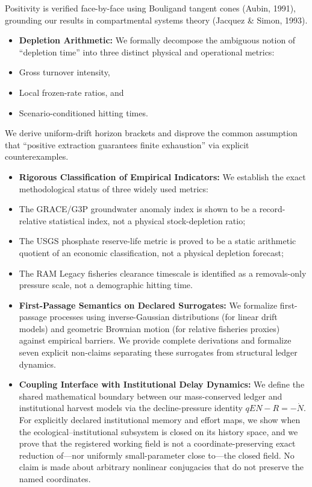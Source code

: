 \documentclass[11pt]{article}
\begin{document}
Positivity is verified face-by-face using Bouligand tangent cones (Aubin, 1991), grounding our results in compartmental systems theory (Jacquez \& Simon, 1993).

\begin{itemize}\setlength{\itemsep}{2pt}
\item \textbf{Depletion Arithmetic:} We formally decompose the ambiguous notion of ``depletion time'' into three distinct physical and operational metrics:
\item Gross turnover intensity,
\item Local frozen-rate ratios, and
\item Scenario-conditioned hitting times.
\end{itemize}

We derive uniform-drift horizon brackets and disprove the common assumption that ``positive extraction guarantees finite exhaustion'' via explicit counterexamples.

\begin{itemize}\setlength{\itemsep}{2pt}
\item \textbf{Rigorous Classification of Empirical Indicators:} We establish the exact methodological status of three widely used metrics:
\item The GRACE/G3P groundwater anomaly index is shown to be a record-relative statistical index, not a physical stock-depletion ratio;
\item The USGS phosphate reserve-life metric is proved to be a static arithmetic quotient of an economic classification, not a physical depletion forecast;
\item The RAM Legacy fisheries clearance timescale is identified as a removals-only pressure scale, not a demographic hitting time.
\item \textbf{First-Passage Semantics on Declared Surrogates:} We formalize first-passage processes using inverse-Gaussian distributions (for linear drift models) and geometric Brownian motion (for relative fisheries proxies) against empirical barriers. We provide complete derivations and formalize seven explicit non-claims separating these surrogates from structural ledger dynamics.
\item \textbf{Coupling Interface with Institutional Delay Dynamics:} We define the shared mathematical boundary between our mass-conserved ledger and institutional harvest models via the decline-pressure identity \(qEN - R = -\dot{N}\). For explicitly declared institutional memory and effort maps, we show when the ecological--institutional subsystem is closed on its history space, and we prove that the registered working field is not a coordinate-preserving exact reduction of---nor uniformly small-parameter close to---the closed field. No claim is made about arbitrary nonlinear conjugacies that do not preserve the named coordinates.
\end{itemize}
\end{document}
